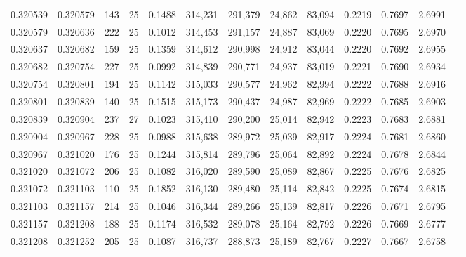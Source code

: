 \begin{tabular}{rrrrrrrrrrrrr}
0.320539 & 0.320579 &   143 &  25 &                                     0.1488 & 314,231 & 291,379 &  24,862 &  83,094 & 0.2219 & 0.7697 & 2.6991 \\
0.320579 & 0.320636 &   222 &  25 &                                     0.1012 & 314,453 & 291,157 &  24,887 &  83,069 & 0.2220 & 0.7695 & 2.6970 \\
0.320637 & 0.320682 &   159 &  25 &                                     0.1359 & 314,612 & 290,998 &  24,912 &  83,044 & 0.2220 & 0.7692 & 2.6955 \\
0.320682 & 0.320754 &   227 &  25 &                                     0.0992 & 314,839 & 290,771 &  24,937 &  83,019 & 0.2221 & 0.7690 & 2.6934 \\
0.320754 & 0.320801 &   194 &  25 &                                     0.1142 & 315,033 & 290,577 &  24,962 &  82,994 & 0.2222 & 0.7688 & 2.6916 \\
0.320801 & 0.320839 &   140 &  25 &                                     0.1515 & 315,173 & 290,437 &  24,987 &  82,969 & 0.2222 & 0.7685 & 2.6903 \\
0.320839 & 0.320904 &   237 &  27 &                                     0.1023 & 315,410 & 290,200 &  25,014 &  82,942 & 0.2223 & 0.7683 & 2.6881 \\
0.320904 & 0.320967 &   228 &  25 &                                     0.0988 & 315,638 & 289,972 &  25,039 &  82,917 & 0.2224 & 0.7681 & 2.6860 \\
0.320967 & 0.321020 &   176 &  25 &                                     0.1244 & 315,814 & 289,796 &  25,064 &  82,892 & 0.2224 & 0.7678 & 2.6844 \\
0.321020 & 0.321072 &   206 &  25 &                                     0.1082 & 316,020 & 289,590 &  25,089 &  82,867 & 0.2225 & 0.7676 & 2.6825 \\
0.321072 & 0.321103 &   110 &  25 &                                     0.1852 & 316,130 & 289,480 &  25,114 &  82,842 & 0.2225 & 0.7674 & 2.6815 \\
0.321103 & 0.321157 &   214 &  25 &                                     0.1046 & 316,344 & 289,266 &  25,139 &  82,817 & 0.2226 & 0.7671 & 2.6795 \\
0.321157 & 0.321208 &   188 &  25 &                                     0.1174 & 316,532 & 289,078 &  25,164 &  82,792 & 0.2226 & 0.7669 & 2.6777 \\
0.321208 & 0.321252 &   205 &  25 &                                     0.1087 & 316,737 & 288,873 &  25,189 &  82,767 & 0.2227 & 0.7667 & 2.6758 \\

\end{tabular}
